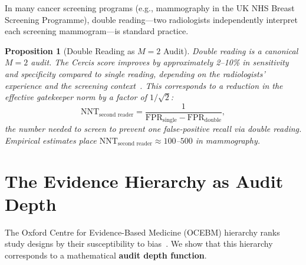 \documentclass[12pt,a4paper]{article}
\newtheorem{proposition}[theorem]{Proposition}
\theoremstyle{remark}
\newcommand{\Cercis}{\textsf{Cercis}}
\begin{document}
In many cancer screening programs (e.g., mammography in the UK NHS Breast
Screening Programme), double reading---two radiologists independently
interpret each screening mammogram---is standard practice.

\begin{proposition}[Double Reading as $M=2$ Audit]
\label{prop:double_reading}
Double reading is a canonical $M=2$ audit. The \Cercis{} score improves
by approximately 2--10\% in sensitivity and specificity compared to
single reading, depending on the radiologists' experience and the
screening context~\cite{taylor2004double}. This corresponds to a reduction
in the effective gatekeeper norm by a factor of $1/\sqrt{2}$:
\begin{equation}
  \text{NNT}_{\text{second reader}} = \frac{1}
  {\text{FPR}_{\text{single}} - \text{FPR}_{\text{double}}},
\end{equation}
the number needed to screen to prevent one false-positive recall via
double reading. Empirical estimates place $\text{NNT}_{\text{second reader}}
\approx 100$--$500$ in mammography.
\end{proposition}


\section{The Evidence Hierarchy as Audit Depth}
\label{sec:hierarchy}

The Oxford Centre for Evidence-Based Medicine (OCEBM) hierarchy ranks
study designs by their susceptibility to bias~\cite{ocebm2011}. We show
that this hierarchy corresponds to a mathematical \textbf{audit depth
function}.
\end{document}
